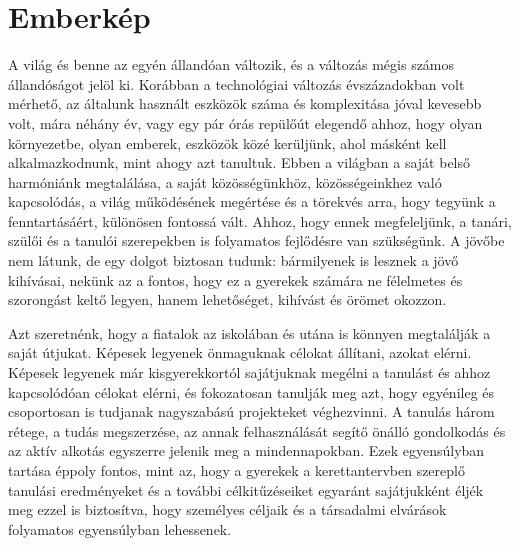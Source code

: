 \section{Emberkép}
\label{sec:gyerekkep}


A világ és benne az egyén állandóan változik, és a változás mégis számos állandóságot jelöl ki. Korábban a technológiai változás évszázadokban volt mérhető, az általunk használt eszközök száma és komplexitása jóval kevesebb volt, mára néhány év, vagy egy pár órás repülőút elegendő ahhoz, hogy olyan környezetbe, olyan emberek, eszközök közé kerüljünk, ahol másként kell alkalmazkodnunk, mint ahogy azt tanultuk. Ebben a világban a saját belső harmóniánk megtalálása, a saját közösségünkhöz, közösségeinkhez való kapcsolódás, a világ működésének megértése és a törekvés arra, hogy tegyünk a fenntartásáért, különösen fontossá vált. Ahhoz, hogy ennek megfeleljünk, a tanári, szülői és a tanulói szerepekben is folyamatos fejlődésre van szükségünk. A jövőbe nem látunk, de egy dolgot biztosan tudunk: bármilyenek is lesznek a jövő kihívásai, nekünk az a fontos, hogy ez a gyerekek számára ne félelmetes és szorongást keltő legyen, hanem lehetőséget, kihívást és örömet okozzon.

Azt szeretnénk, hogy a fiatalok az iskolában és utána is könnyen megtalálják a saját útjukat. Képesek legyenek önmaguknak célokat állítani, azokat elérni. Képesek legyenek már kisgyerekkortól sajátjuknak megélni a tanulást és ahhoz kapcsolódóan célokat elérni, és fokozatosan tanulják meg azt, hogy egyénileg és csoportosan is tudjanak nagyszabású projekteket véghezvinni. A tanulás három rétege, a tudás megszerzése, az annak felhasználását segítő önálló gondolkodás és az aktív alkotás egyszerre jelenik meg a mindennapokban. Ezek egyensúlyban tartása éppoly fontos, mint az, hogy 
a gyerekek a kerettantervben szereplő tanulási eredményeket és a további célkitűzéseiket egyaránt sajátjukként éljék meg ezzel is biztosítva, hogy személyes céljaik és a társadalmi elvárások folyamatos egyensúlyban lehessenek.  

